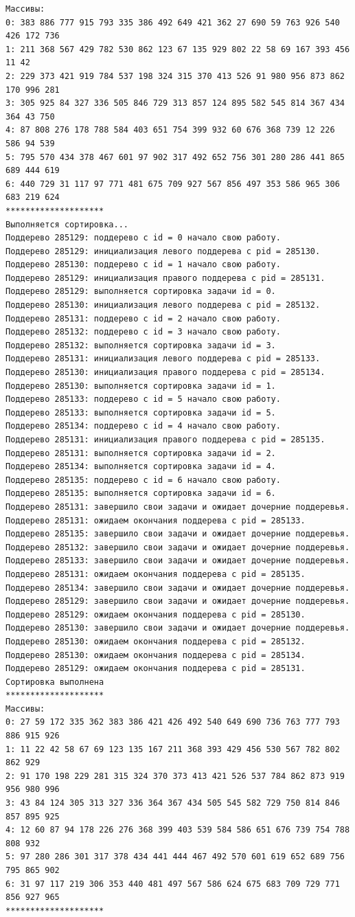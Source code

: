 \documentclass[a4paper,14pt]{extarticle}
\begin{document}
\begin{verbatim}
Массивы:
0: 383 886 777 915 793 335 386 492 649 421 362 27 690 59 763 926 540 426 172 736 
1: 211 368 567 429 782 530 862 123 67 135 929 802 22 58 69 167 393 456 11 42 
2: 229 373 421 919 784 537 198 324 315 370 413 526 91 980 956 873 862 170 996 281 
3: 305 925 84 327 336 505 846 729 313 857 124 895 582 545 814 367 434 364 43 750 
4: 87 808 276 178 788 584 403 651 754 399 932 60 676 368 739 12 226 586 94 539 
5: 795 570 434 378 467 601 97 902 317 492 652 756 301 280 286 441 865 689 444 619 
6: 440 729 31 117 97 771 481 675 709 927 567 856 497 353 586 965 306 683 219 624 
********************
Выполняется сортировка...
Поддерево 285129: поддерево с id = 0 начало свою работу.
Поддерево 285129: инициализация левого поддерева с pid = 285130.
Поддерево 285130: поддерево с id = 1 начало свою работу.
Поддерево 285129: инициализация правого поддерева с pid = 285131.
Поддерево 285129: выполняется сортировка задачи id = 0.
Поддерево 285130: инициализация левого поддерева с pid = 285132.
Поддерево 285131: поддерево с id = 2 начало свою работу.
Поддерево 285132: поддерево с id = 3 начало свою работу.
Поддерево 285132: выполняется сортировка задачи id = 3.
Поддерево 285131: инициализация левого поддерева с pid = 285133.
Поддерево 285130: инициализация правого поддерева с pid = 285134.
Поддерево 285130: выполняется сортировка задачи id = 1.
Поддерево 285133: поддерево с id = 5 начало свою работу.
Поддерево 285133: выполняется сортировка задачи id = 5.
Поддерево 285134: поддерево с id = 4 начало свою работу.
Поддерево 285131: инициализация правого поддерева с pid = 285135.
Поддерево 285131: выполняется сортировка задачи id = 2.
Поддерево 285134: выполняется сортировка задачи id = 4.
Поддерево 285135: поддерево с id = 6 начало свою работу.
Поддерево 285135: выполняется сортировка задачи id = 6.
Поддерево 285131: завершило свои задачи и ожидает дочерние поддеревья.
Поддерево 285131: ожидаем окончания поддерева с pid = 285133.
Поддерево 285135: завершило свои задачи и ожидает дочерние поддеревья.
Поддерево 285132: завершило свои задачи и ожидает дочерние поддеревья.
Поддерево 285133: завершило свои задачи и ожидает дочерние поддеревья.
Поддерево 285131: ожидаем окончания поддерева с pid = 285135.
Поддерево 285134: завершило свои задачи и ожидает дочерние поддеревья.
Поддерево 285129: завершило свои задачи и ожидает дочерние поддеревья.
Поддерево 285129: ожидаем окончания поддерева с pid = 285130.
Поддерево 285130: завершило свои задачи и ожидает дочерние поддеревья.
Поддерево 285130: ожидаем окончания поддерева с pid = 285132.
Поддерево 285130: ожидаем окончания поддерева с pid = 285134.
Поддерево 285129: ожидаем окончания поддерева с pid = 285131.
Сортировка выполнена
********************
Массивы:
0: 27 59 172 335 362 383 386 421 426 492 540 649 690 736 763 777 793 886 915 926 
1: 11 22 42 58 67 69 123 135 167 211 368 393 429 456 530 567 782 802 862 929 
2: 91 170 198 229 281 315 324 370 373 413 421 526 537 784 862 873 919 956 980 996 
3: 43 84 124 305 313 327 336 364 367 434 505 545 582 729 750 814 846 857 895 925 
4: 12 60 87 94 178 226 276 368 399 403 539 584 586 651 676 739 754 788 808 932 
5: 97 280 286 301 317 378 434 441 444 467 492 570 601 619 652 689 756 795 865 902 
6: 31 97 117 219 306 353 440 481 497 567 586 624 675 683 709 729 771 856 927 965 
********************
\end{verbatim}
\end{document}
